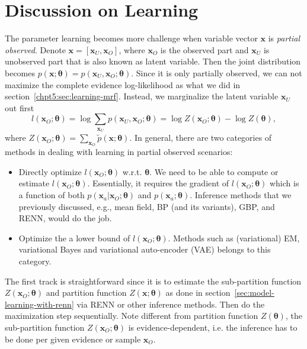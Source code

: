 \section{Discussion on Learning}

The parameter learning becomes more challenge when variable vector $\bm{x}$ is \textit{partial observed}. Denote $\bm{x} = [\bm{x}_U, \bm{x}_O]$, where $\bm{x}_O$ is the observed part and $\bm{x}_U$ is unobserved part that is also known as latent variable. Then the joint distribution becomes $p(\bm{x}; \bm{\theta}) = p(\bm{x}_U, \bm{x}_O; \bm{\theta})$. Since it is only partially observed, we can not maximize the complete evidence log-likelihood as what we did in section~\ref{chpt5:sec:learning-mrf}. Instead, we marginalize the latent variable $\bm{x}_U$ out first
\begin{equation}\label{chpt2:eq:patial-likelihood}
  l(\bm{x}_O; \bm{\theta}) = \log{\sum_{\bm{x}_U}p(\bm{x}_U, \bm{x}_O; \bm{\theta})} = \log{Z(\bm{x}_O;\bm{\theta})} - \log{Z(\bm{\theta})},
\end{equation}
where $Z(\bm{x}_O;\bm{\theta}) = \sum_{\bm{x}_O}\tilde{p}(\bm{x}; \bm{\theta})$. In general, there are two categories of methods in dealing with learning in partial observed scenarios:
\begin{itemize}
\item Directly optimize $l(\bm{x}_O; \bm{\theta})$ w.r.t. $\bm{\theta}$. We need to be able to compute or estimate $l(\bm{x}_O; \bm{\theta})$. Essentially, it requires the gradient of $l(\bm{x}_O; \bm{\theta})$ which is a function of both $p(\bm{x}_a| \bm{x}_O; \bm{\theta})$ and $p(\bm{x}_a; \bm{\theta})$. Inference methods that we previously discussed, e.g., mean field, BP (and its variants), GBP, and RENN, would do the job.
\item Optimize the a lower bound of $l(\bm{x}_O; \bm{\theta})$. Methods such as (variational) EM, variational Bayes and variational auto-encoder (VAE) \cite{kingma2019vae} belongs to this category.
\end{itemize}

The first track is straightforward since it is to estimate the sub-partition function $Z(\bm{x}_O; \bm{\theta})$ and partition function $Z(\bm{x}; \bm{\theta})$ as done in section~\ref{sec:model-learning-with-renn} via RENN or other inference methods. Then do the maximization step sequentially. Note different from partition function $Z(\bm{\theta})$, the sub-partition function $Z(\bm{x}_O; \bm{\theta})$ is evidence-dependent, i.e. the inference has to be done per given evidence or sample  $\bm{x}_O$. 

